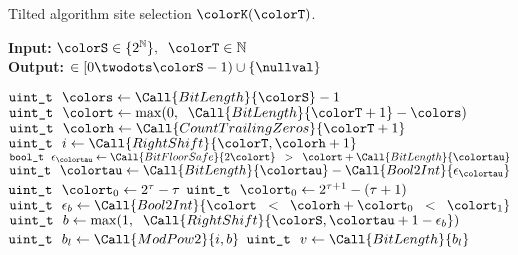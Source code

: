 \begin{algorithm}[H]
\caption{Tilted algorithm site selection $\colorK(\colorT)$.}
\label{alg:tilted-site-selection}
\begin{minipage}{0.53\textwidth}
    \label{alg:example}
    \hspace*{\algorithmicindent} \textbf{Input:} $\colorS \in \{2^{\mathbb{N}}\},\;\; \colorT \in \mathbb{N}$ \\
    \hspace*{\algorithmicindent} \textbf{Output:} $\in [0 \twodots \colorS - 1) \cup \{\nullval\}$ 
    \begin{algorithmic}[1]
        \State $\texttt{uint\_t} ~ ~ \colors \gets \Call{BitLength}{\colorS} - 1$
        \State $\texttt{uint\_t} ~ ~ \colort \gets \max(0,\;\; \Call{BitLength}{\colorT+1} - \colors)$ 
        \State $\texttt{uint\_t} ~ ~ \colorh \gets \Call{CountTrailingZeros}{\colorT + 1}$ 
        \Statex
        \State $\texttt{uint\_t} ~ ~ i \gets \Call{RightShift}{\colorT, \colorh + 1}$ 
        \State $\texttt{bool\_t} ~ ~ \epsilon_{\colortau} \gets \Call{BitFloorSafe}{2\colort} \;\; > \;\; \colort + \Call{BitLength}{\colortau}$ 
        \State $\texttt{uint\_t} ~ ~ \colortau \gets  \Call{BitLength}{\colortau} - \Call{Bool2Int}{\epsilon_{\colortau}}$ 
        \State $\texttt{uint\_t} ~ ~ \colort_0 \gets 2^{\tau} - \tau$ 
        \State $\texttt{uint\_t} ~ ~ \colort_0 \gets 2^{\tau + 1} - (\tau + 1)$ 
        \State $\texttt{uint\_t} ~ ~ \epsilon_b \gets \Call{Bool2Int}{\colort \;\; < \;\; \colorh + \colort_0 \;\; < \;\; \colort_1}$ 
        \State $\texttt{uint\_t} ~ ~ b \gets \max(1,\;\; \Call{RightShift}{\colorS, \colortau + 1 - \epsilon_b})$ 
        \Statex
        \State $\texttt{uint\_t} ~ ~ b_l \gets \Call{ModPow2}{i, b}$ 
        \Statex {}
        \Statex
        \Statex {}
        \Statex {}
        \Statex
        \State $\texttt{uint\_t} ~ ~ v \gets \Call{BitLength}{b_l}$ 

\end{algorithmic}
\end{minipage}
\end{algorithm}
